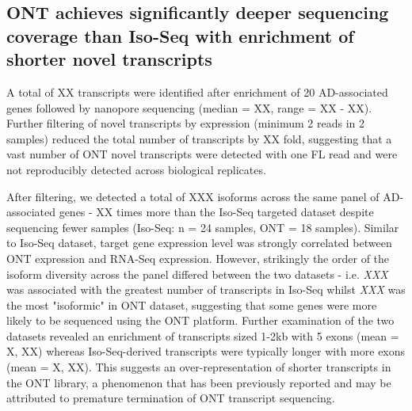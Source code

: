 \clearpage
\subsection{ONT achieves significantly deeper sequencing coverage than Iso-Seq with enrichment of shorter novel transcripts}
A total of XX transcripts were identified after enrichment of 20 AD-associated genes followed by nanopore sequencing (median = XX, range = XX - XX). Further filtering of novel transcripts by expression (minimum 2 reads in 2 samples) reduced the total number of transcripts by XX fold, suggesting that a vast number of ONT novel transcripts were detected with one FL read and were not reproducibly detected across biological replicates. 

After filtering, we detected a total of XXX isoforms across the same panel of AD-associated genes - XX times more than the Iso-Seq targeted dataset despite sequencing fewer samples (Iso-Seq: n = 24 samples, ONT = 18 samples). Similar to Iso-Seq dataset, target gene expression level was strongly correlated between ONT expression and RNA-Seq expression. However, strikingly the order of the isoform diversity across the panel differed between the two datasets - i.e. \textit{XXX} was associated with the greatest number of transcripts in Iso-Seq whilst \textit{XXX} was the most "isoformic" in ONT dataset, suggesting that some genes were more likely to be sequenced using the ONT platform. Further examination of the two datasets revealed an enrichment of transcripts sized 1-2kb with 5 exons (mean = X, XX) whereas Iso-Seq-derived transcripts were typically longer with more exons (mean = X, XX). This suggests an over-representation of shorter transcripts in the ONT library, a phenomenon that has been previously reported and may be attributed to premature termination of ONT transcript sequencing. 

